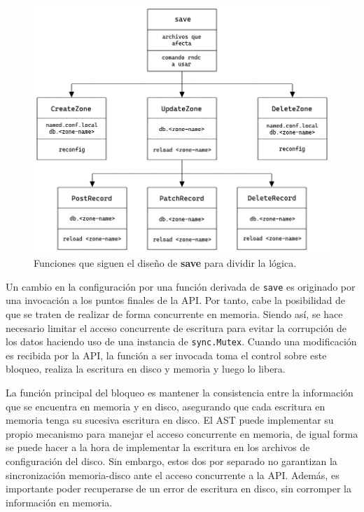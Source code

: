 \begin{figure}[!ht]
    \centering
    \includegraphics[width=\linewidth]{draws/split-save.png}
    \caption{Funciones que siguen el diseño de \textbf{save} para dividir la lógica.}
    \label{fig:split-save}
\end{figure}

Un cambio en la configuración por una función derivada de \verb|save| es originado por una invocación a los puntos finales de la API. Por tanto, cabe la posibilidad de que se traten de realizar de forma concurrente en memoria. Siendo así, se hace necesario limitar el acceso concurrente de escritura para evitar la corrupción de los datos haciendo uso de una instancia de \verb|sync.Mutex|. Cuando una modificación es recibida por la API, la función a ser invocada toma el control sobre este bloqueo, realiza la escritura en disco y memoria y luego lo libera.

La función principal del bloqueo es mantener la consistencia entre la información que se encuentra en memoria y en disco, asegurando que cada escritura en memoria tenga su sucesiva escritura en disco. El AST puede implementar su propio mecanismo para manejar el acceso concurrente en memoria, de igual forma se puede hacer a la hora de implementar la escritura en los archivos de configuración del disco. Sin embargo, estos dos por separado no garantizan la sincronización memoria-disco ante el acceso concurrente a la API. Además, es importante poder recuperarse de un error de escritura en disco, sin corromper la información en memoria.


